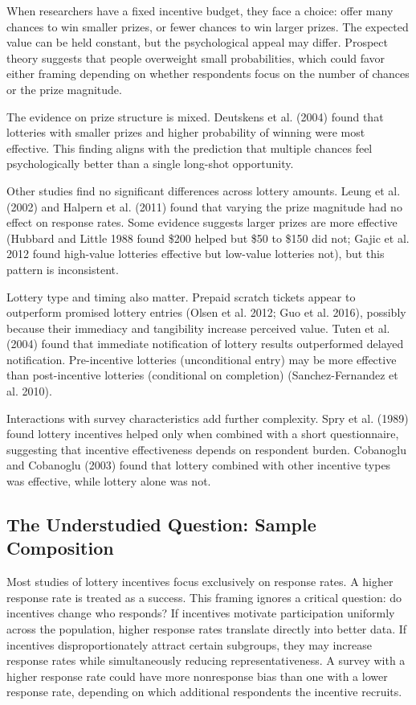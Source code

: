 \documentclass[12pt]{article}
\begin{document}
When researchers have a fixed incentive budget, they face a choice: offer many chances to win smaller prizes, or fewer chances to win larger prizes. The expected value can be held constant, but the psychological appeal may differ. Prospect theory suggests that people overweight small probabilities, which could favor either framing depending on whether respondents focus on the number of chances or the prize magnitude.

The evidence on prize structure is mixed. Deutskens et al. (2004) found that lotteries with smaller prizes and higher probability of winning were most effective. This finding aligns with the prediction that multiple chances feel psychologically better than a single long-shot opportunity.

Other studies find no significant differences across lottery amounts. Leung et al. (2002) and Halpern et al. (2011) found that varying the prize magnitude had no effect on response rates. Some evidence suggests larger prizes are more effective (Hubbard and Little 1988 found \$200 helped but \$50 to \$150 did not; Gajic et al. 2012 found high-value lotteries effective but low-value lotteries not), but this pattern is inconsistent.

Lottery type and timing also matter. Prepaid scratch tickets appear to outperform promised lottery entries (Olsen et al. 2012; Guo et al. 2016), possibly because their immediacy and tangibility increase perceived value. Tuten et al. (2004) found that immediate notification of lottery results outperformed delayed notification. Pre-incentive lotteries (unconditional entry) may be more effective than post-incentive lotteries (conditional on completion) (Sanchez-Fernandez et al. 2010).

Interactions with survey characteristics add further complexity. Spry et al. (1989) found lottery incentives helped only when combined with a short questionnaire, suggesting that incentive effectiveness depends on respondent burden. Cobanoglu and Cobanoglu (2003) found that lottery combined with other incentive types was effective, while lottery alone was not.

\subsection{The Understudied Question: Sample Composition}

Most studies of lottery incentives focus exclusively on response rates. A higher response rate is treated as a success. This framing ignores a critical question: do incentives change who responds?
If incentives motivate participation uniformly across the population, higher response rates translate directly into better data. If incentives disproportionately attract certain subgroups, they may increase response rates while simultaneously reducing representativeness. A survey with a higher response rate could have more nonresponse bias than one with a lower response rate, depending on which additional respondents the incentive recruits.
\end{document}
